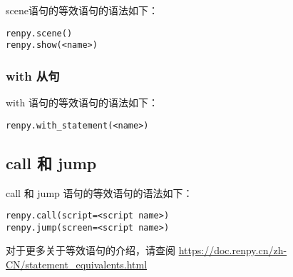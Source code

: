 \documentclass[../../Main.tex]{subfiles}
\begin{document}
scene语句的等效语句的语法如下：

\begin{lstlisting}
renpy.scene()
renpy.show(<name>)
\end{lstlisting}

\subsubsection{with 从句}

with 语句的等效语句的语法如下：

\begin{lstlisting}
renpy.with_statement(<name>)
\end{lstlisting}

\subsection{call 和 jump}

call 和 jump 语句的等效语句的语法如下：

\begin{lstlisting}
renpy.call(script=<script name>)
renpy.jump(screen=<script name>)
\end{lstlisting}

对于更多关于等效语句的介绍，请查阅 \url{https://doc.renpy.cn/zh-CN/statement_equivalents.html}
\end{document}
